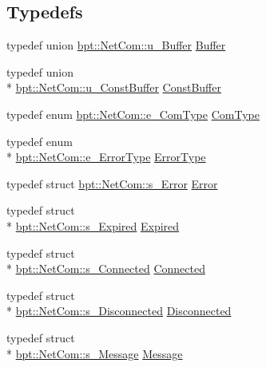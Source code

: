 \subsection*{Typedefs}
\begin{DoxyCompactItemize}
\item 
typedef union \hyperlink{unionbpt_1_1_net_com_1_1u___buffer}{bpt\-::\-Net\-Com\-::u\-\_\-\-Buffer} \hyperlink{namespacebpt_1_1_net_com_ab30a61348361333a522ae21fb65fdbd0}{Buffer}
\item 
typedef union \\*
\hyperlink{unionbpt_1_1_net_com_1_1u___const_buffer}{bpt\-::\-Net\-Com\-::u\-\_\-\-Const\-Buffer} \hyperlink{namespacebpt_1_1_net_com_a14dfd9cc896549a6141d0801f8631771}{Const\-Buffer}
\item 
typedef enum \hyperlink{namespacebpt_1_1_net_com_af9a32b3ed140e0524b0ed8d7b98afe31}{bpt\-::\-Net\-Com\-::e\-\_\-\-Com\-Type} \hyperlink{namespacebpt_1_1_net_com_a73b47b2b099bf7d28997dc72c921212c}{Com\-Type}
\item 
typedef enum \\*
\hyperlink{namespacebpt_1_1_net_com_a5170d932195b5bf312c95a063bcf97f7}{bpt\-::\-Net\-Com\-::e\-\_\-\-Error\-Type} \hyperlink{namespacebpt_1_1_net_com_a401866ee6997493e98c7823af2d1bca6}{Error\-Type}
\item 
typedef struct \hyperlink{structbpt_1_1_net_com_1_1s___error}{bpt\-::\-Net\-Com\-::s\-\_\-\-Error} \hyperlink{namespacebpt_1_1_net_com_ae61d63e0ecc44c7b3a5a9a71df6a3e60}{Error}
\item 
typedef struct \\*
\hyperlink{structbpt_1_1_net_com_1_1s___expired}{bpt\-::\-Net\-Com\-::s\-\_\-\-Expired} \hyperlink{namespacebpt_1_1_net_com_a71deac9d5c07a72565490311030b44fe}{Expired}
\item 
typedef struct \\*
\hyperlink{structbpt_1_1_net_com_1_1s___connected}{bpt\-::\-Net\-Com\-::s\-\_\-\-Connected} \hyperlink{namespacebpt_1_1_net_com_a4704a0eb0b7d8aa56b2f17fb7536e61e}{Connected}
\item 
typedef struct \\*
\hyperlink{structbpt_1_1_net_com_1_1s___disconnected}{bpt\-::\-Net\-Com\-::s\-\_\-\-Disconnected} \hyperlink{namespacebpt_1_1_net_com_a9c3ba50108780e0eb42c6e684de8e39e}{Disconnected}
\item 
typedef struct \\*
\hyperlink{structbpt_1_1_net_com_1_1s___message}{bpt\-::\-Net\-Com\-::s\-\_\-\-Message} \hyperlink{namespacebpt_1_1_net_com_a7d87de97bd1bd619332891928f53ec33}{Message}

\end{DoxyCompactItemize}
